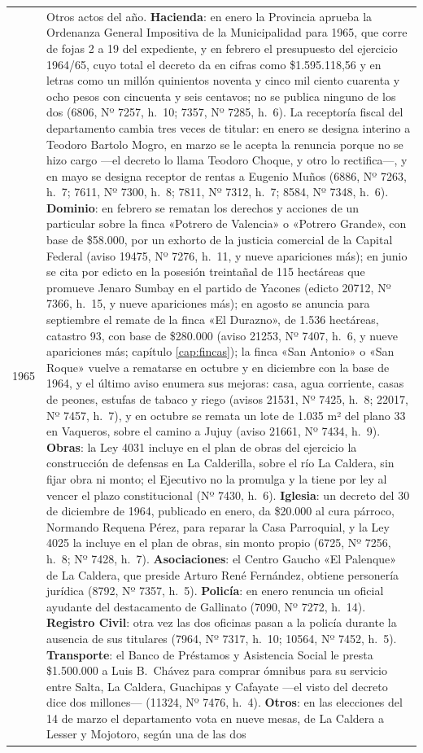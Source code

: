 \begin{longtable}{@{}p{2.7cm}p{10.3cm}@{}}
1965 & Otros actos del año. \textbf{Hacienda}: en enero la Provincia aprueba la Ordenanza General Impositiva de la Municipalidad para 1965, que corre de fojas 2 a 19 del expediente, y en febrero el presupuesto del ejercicio 1964/65, cuyo total el decreto da en cifras como \$1.595.118,56 y en letras como un millón quinientos noventa y cinco mil ciento cuarenta y ocho pesos con cincuenta y seis centavos; no se publica ninguno de los dos (6806, Nº 7257, h.\ 10; 7357, Nº 7285, h.\ 6). La receptoría fiscal del departamento cambia tres veces de titular: en enero se designa interino a Teodoro Bartolo Mogro, en marzo se le acepta la renuncia porque no se hizo cargo ---el decreto lo llama Teodoro Choque, y otro lo rectifica---, y en mayo se designa receptor de rentas a Eugenio Muños (6886, Nº 7263, h.\ 7; 7611, Nº 7300, h.\ 8; 7811, Nº 7312, h.\ 7; 8584, Nº 7348, h.\ 6). \textbf{Dominio}: en febrero se rematan los derechos y acciones de un particular sobre la finca «Potrero de Valencia» o «Potrero Grande», con base de \$58.000, por un exhorto de la justicia comercial de la Capital Federal (aviso 19475, Nº 7276, h.\ 11, y nueve apariciones más); en junio se cita por edicto en la posesión treintañal de 115 hectáreas que promueve Jenaro Sumbay en el partido de Yacones (edicto 20712, Nº 7366, h.\ 15, y nueve apariciones más); en agosto se anuncia para septiembre el remate de la finca «El Durazno», de 1.536 hectáreas, catastro 93, con base de \$280.000 (aviso 21253, Nº 7407, h.\ 6, y nueve apariciones más; capítulo \ref{cap:fincas}); la finca «San Antonio» o «San Roque» vuelve a rematarse en octubre y en diciembre con la base de 1964, y el último aviso enumera sus mejoras: casa, agua corriente, casas de peones, estufas de tabaco y riego (avisos 21531, Nº 7425, h.\ 8; 22017, Nº 7457, h.\ 7), y en octubre se remata un lote de 1.035 m² del plano 33 en Vaqueros, sobre el camino a Jujuy (aviso 21661, Nº 7434, h.\ 9). \textbf{Obras}: la Ley 4031 incluye en el plan de obras del ejercicio la construcción de defensas en La Calderilla, sobre el río La Caldera, sin fijar obra ni monto; el Ejecutivo no la promulga y la tiene por ley al vencer el plazo constitucional (Nº 7430, h.\ 6). \textbf{Iglesia}: un decreto del 30 de diciembre de 1964, publicado en enero, da \$20.000 al cura párroco, Normando Requena Pérez, para reparar la Casa Parroquial, y la Ley 4025 la incluye en el plan de obras, sin monto propio (6725, Nº 7256, h.\ 8; Nº 7428, h.\ 7). \textbf{Asociaciones}: el Centro Gaucho «El Palenque» de La Caldera, que preside Arturo René Fernández, obtiene personería jurídica (8792, Nº 7357, h.\ 5). \textbf{Policía}: en enero renuncia un oficial ayudante del destacamento de Gallinato (7090, Nº 7272, h.\ 14). \textbf{Registro Civil}: otra vez las dos oficinas pasan a la policía durante la ausencia de sus titulares (7964, Nº 7317, h.\ 10; 10564, Nº 7452, h.\ 5). \textbf{Transporte}: el Banco de Préstamos y Asistencia Social le presta \$1.500.000 a Luis B.\ Chávez para comprar ómnibus para su servicio entre Salta, La Caldera, Guachipas y Cafayate ---el visto del decreto dice dos millones--- (11324, Nº 7476, h.\ 4). \textbf{Otros}: en las elecciones del 14 de marzo el departamento vota en nueve mesas, de La Caldera a Lesser y Mojotoro, según una de las dos 
\end{longtable}
